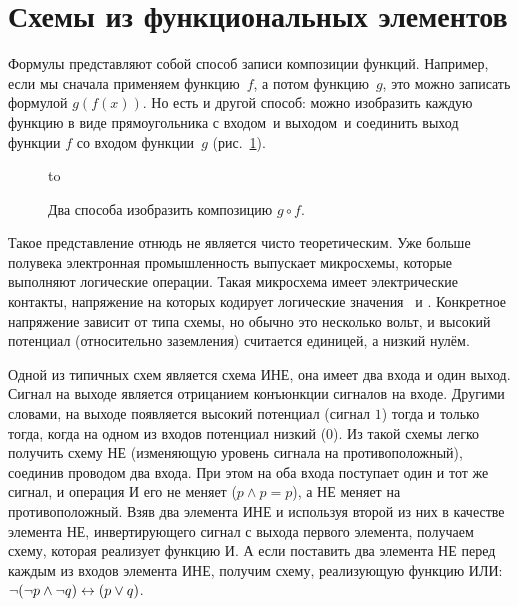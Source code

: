 \section{Схемы из функциональных элементов}%

Формулы представляют собой способ записи композиции функций.
Например, если мы сначала применяем функцию~$f$, а потом
функцию~$g$, это можно записать формулой $g(f(x))$. Но есть и
другой способ: можно изобразить каждую функцию в виде
прямоугольника с  входом\ и  выходом\, и соединить
выход функции $f$ со входом функции~$g$ (рис.~\ref{scheme-1}).

\begin{figure}[h]
\hbox to 
\caption{Два способа изобразить композицию $g\circ f$.}
\label{scheme-1}
\end{figure}

Такое представление отнюдь не является чисто теоретическим. Уже больше полувека электронная промышленность
выпускает микросхемы, которые выполняют логические операции.
Такая микросхема имеет электрические контакты, напряжение на
которых кодирует логические значения \И\ и \Л. Конкретное
напряжение зависит от типа схемы, но обычно это несколько вольт, и
высокий потенциал (относительно заземления) считается единицей,
а низкий нулём.

Одной из типичных схем является схема И\д НЕ, она имеет два входа
и один выход. Сигнал на выходе является отрицанием конъюнкции
сигналов на входе. Другими словами, на выходе появляется высокий
потенциал (сигнал $1$) тогда и только тогда, когда на одном из
входов потенциал низкий ($0$). Из такой схемы легко получить
схему НЕ (изменяющую уровень сигнала на противоположный),
соединив проводом два входа. При этом на оба входа поступает
один и тот же сигнал, и операция И его не меняет ($p\land p=p$),
а НЕ меняет на противоположный. Взяв два элемента И\д НЕ и используя
второй из них в качестве элемента НЕ, инвертирующего сигнал с выхода
первого элемента, получаем схему, которая реализует функцию И. А
если поставить два элемента НЕ перед каждым из входов элемента
И\д НЕ, получим схему, реализующую функцию ИЛИ: $\lnot (\lnot
p\land\lnot q) \hm\leftrightarrow (p\lor q)$.

